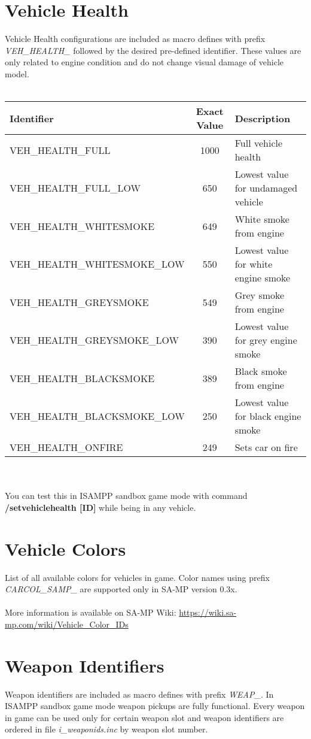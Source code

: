 \documentclass{article}
\begin{document}
\section{Vehicle Health}
Vehicle Health configurations are included as macro defines with prefix \textit{VEH\_HEALTH\_} followed by the desired pre-defined identifier. These values are only related to engine condition and do not change visual damage of vehicle model.
\\
\\
\begin{tabular}{ |l|c|l| } 
\hline
Identifier & Exact Value & Description \\
\hline
VEH\_HEALTH\_FULL & 1000 & Full vehicle health \\ 
VEH\_HEALTH\_FULL\_LOW & 650 &  Lowest value for undamaged vehicle \\ 
VEH\_HEALTH\_WHITESMOKE & 649 & White smoke from engine \\ 
VEH\_HEALTH\_WHITESMOKE\_LOW & 550 & Lowest value for white engine smoke \\ 
VEH\_HEALTH\_GREYSMOKE & 549 & Grey smoke from engine \\ 
VEH\_HEALTH\_GREYSMOKE\_LOW & 390 & Lowest value for grey engine smoke\\ 
VEH\_HEALTH\_BLACKSMOKE & 389 & Black smoke from engine \\ 
VEH\_HEALTH\_BLACKSMOKE\_LOW & 250 & Lowest value for black engine smoke \\ 
VEH\_HEALTH\_ONFIRE & 249 & Sets car on fire \\
\hline
\end{tabular}
\\
\\
You can test this in ISAMPP sandbox game mode with command \textbf{/setvehiclehealth [ID]} while being in any vehicle.

\section{Vehicle Colors}
List of all available colors for vehicles in game. Color names using prefix \textit{CARCOL\_SAMP\_} are supported only in SA-MP version 0.3x.
\\
\\More information is available on SA-MP Wiki: \url{https://wiki.sa-mp.com/wiki/Vehicle_Color_IDs}

\section{Weapon Identifiers}
Weapon identifiers are included as macro defines with prefix \textit{WEAP\_}. In ISAMPP sandbox game mode weapon pickups are fully functional. Every weapon in game can be used only for certain weapon slot and weapon identifiers are ordered in file \textit{i\_weaponids.inc} by weapon slot number.
\end{document}
